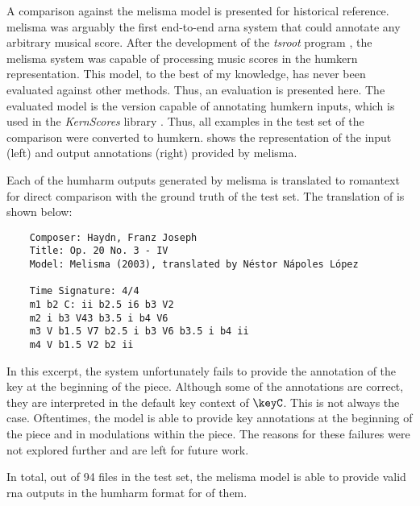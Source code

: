 
A comparison against the \gls{melisma} model is presented
for historical reference. \gls{melisma} was arguably the
first end-to-end \gls{arna} system that could annotate any
arbitrary musical score. After the development of the
\emph{tsroot} program \parencite{sapp2009tsroot}, the
\gls{melisma} system was capable of processing music scores
in the \gls{humkern} representation. This model, to the best
of my knowledge, has never been evaluated against other
methods. Thus, an evaluation is presented here. The
evaluated model is the version capable of annotating
\gls{humkern} inputs, which is used in the \emph{KernScores}
library \parencite{sapp2005online}. Thus, all examples in
the test set of the comparison were converted to
\gls{humkern}.  shows the
representation of the input (left) and output annotations
(right) provided by \gls{melisma}.


Each of the \gls{humharm} outputs generated by \gls{melisma}
is translated to \gls{romantext} for direct comparison with
the ground truth of the test set. The translation of
 is shown below:

\begin{verbatim}
    Composer: Haydn, Franz Joseph
    Title: Op. 20 No. 3 - IV
    Model: Melisma (2003), translated by Néstor Nápoles López
    
    Time Signature: 4/4
    m1 b2 C: ii b2.5 i6 b3 V2
    m2 i b3 V43 b3.5 i b4 V6
    m3 V b1.5 V7 b2.5 i b3 V6 b3.5 i b4 ii
    m4 V b1.5 V2 b2 ii
\end{verbatim}

In this excerpt, the system unfortunately fails to provide
the annotation of the key at the beginning of the piece.
Although some of the annotations are correct, they are
interpreted in the default key context of $\keyC$. This is
not always the case. Oftentimes, the model is able to
provide key annotations at the beginning of the piece and in
modulations within the piece. The reasons for these failures
were not explored further and are left for future work.

In total, out of 94 files in the test set, the \gls{melisma}
model is able to provide valid \gls{rna} outputs in the
\gls{humharm} format for  of them.
